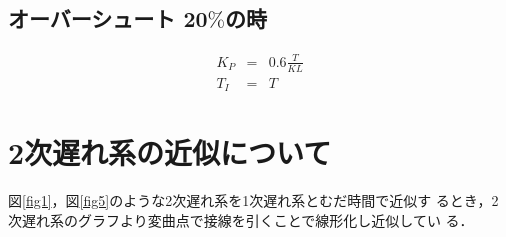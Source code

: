 \documentclass[11pt,a4paper]{jsarticle}
\begin{document}
\subsection{オーバーシュート 20$\%$の時}
\begin{eqnarray*}
 K_P & = & 0.6 \frac{T}{KL} \\
 T_I & = & T
\end{eqnarray*}

\newpage
\setcounter{page}{1}
\pagestyle{fancy}
\renewcommand{\headrulewidth}{0.0pt}
\lhead{}
\cfoot{}
 
\section{2次遅れ系の近似について}
図\ref{fig1}，図\ref{fig5}のような2次遅れ系を1次遅れ系とむだ時間で近似す
るとき，2次遅れ系のグラフより変曲点で接線を引くことで線形化し近似してい
る．
\end{document}
